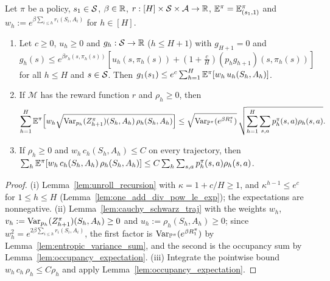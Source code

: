 \begin{lemma}\label{lem:pos_core_unroll}
\leanok
{}
Let $\pi$ be a policy, $s_1 \in \mathcal{S}$, $\beta \in \mathbb{R}$, $r : [H] \times \mathcal{S} \times \mathcal{A} \to \mathbb{R}$,
$\mathbb{E}^\pi = \mathbb{E}^\pi_{(s_1, 1)}$ and $w_h := e^{\beta\sum_{i \le h} r_i(S_i, A_i)}$ for $h \in [H]$.
\begin{enumerate}
  \item[(i)] Let $c \ge 0$, $u_h \ge 0$ and $g_h : \mathcal{S} \to \mathbb{R}$ ($h \le H + 1$) with $g_{H+1} = 0$ and
  $g_h(s) \le e^{\beta r_h(s,\pi_h(s))}[u_h(s, \pi_h(s)) + (1 + \frac cH)(p_h g_{h+1})(s, \pi_h(s))]$
  for all $h \le H$ and $s \in \mathcal{S}$. Then $g_1(s_1) \le e^c\sum_{h=1}^H\mathbb{E}^\pi[w_h\,u_h(S_h, A_h)]$.
  \item[(ii)] If $\mathcal M$ has the reward function $r$ and $\rho_h \ge 0$, then
  \[
    \sum_{h=1}^H\mathbb{E}^\pi\Big[w_h\sqrt{\operatorname{Var}_{p_h}(Z^\pi_{h+1})(S_h, A_h)\,\rho_h(S_h, A_h)}\Big]
    \le \sqrt{\operatorname{Var}_{\mathbb{P}^\pi}(e^{\beta R_1^\pi})}\,\sqrt{\sum_{h=1}^H\sum_{s,a}p^\pi_h(s,a)\rho_h(s,a)} .
  \]
  \item[(iii)] If $\rho_h \ge 0$ and $w_h\,c_h(S_h, A_h) \le C$ on every trajectory, then
  $\sum_h\mathbb{E}^\pi[w_h\,c_h(S_h, A_h)\,\rho_h(S_h, A_h)] \le C\sum_h\sum_{s,a}p^\pi_h(s,a)\rho_h(s,a)$.
\end{enumerate}
\end{lemma}

\begin{proof}
\leanok
(i) Lemma~\ref{lem:unroll_recursion} with $\kappa = 1 + c/H \ge 1$, and $\kappa^{h-1} \le e^c$ for
$1 \le h \le H$ (Lemma~\ref{lem:one_add_div_pow_le_exp}); the expectations are nonnegative.
(ii) Lemma~\ref{lem:cauchy_schwarz_traj} with the weights $w_h$, $v_h := \operatorname{Var}_{p_h}(Z^\pi_{h+1})(S_h, A_h) \ge 0$
and $u_h := \rho_h(S_h, A_h) \ge 0$; since $w_h^2 = e^{2\beta\sum_{i \le h} r_i(S_i,A_i)}$, the first factor is
$\operatorname{Var}_{\mathbb{P}^\pi}(e^{\beta R_1^\pi})$ by Lemma~\ref{lem:entropic_variance_sum}, and the second is the occupancy
sum by Lemma~\ref{lem:occupancy_expectation}. (iii) Integrate the pointwise bound
$w_h\,c_h\,\rho_h \le C\rho_h$ and apply Lemma~\ref{lem:occupancy_expectation}.
\end{proof}

